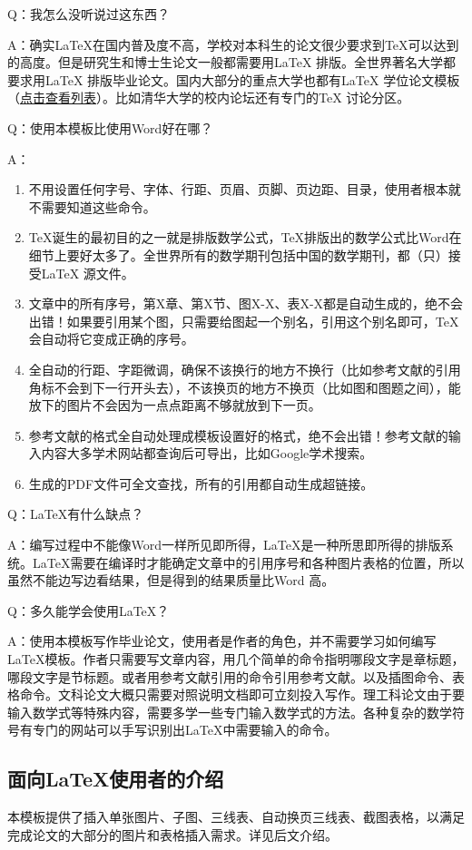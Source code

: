Q：我怎么没听说过这东西？

A：确实\LaTeX{}在国内普及度不高，学校对本科生的论文很少要求到\TeX{}可以达到的高度。但是研究生和博士生论文一般都需要用\LaTeX{} 排版。全世界著名大学都要求用\LaTeX{} 排版毕业论文。国内大部分的重点大学也都有\LaTeX{} 学位论文模板（\href{http://zzg34b.w3.c361.com/templet/graduateThesis.htm}{点击查看列表}）。比如清华大学的校内论坛还有专门的TeX 讨论分区。

Q：使用本模板比使用Word好在哪？

A：
\begin{enumerate}
\item 不用设置任何字号、字体、行距、页眉、页脚、页边距、目录，使用者根本就不需要知道这些命令。
\item \TeX{}诞生的最初目的之一就是排版数学公式，\TeX{}排版出的数学公式比Word在细节上要好太多了。全世界所有的数学期刊包括中国的数学期刊，都（只）接受\LaTeX{} 源文件。
\item 文章中的所有序号，第X章、第X节、图X-X、表X-X都是自动生成的，绝不会出错！如果要引用某个图，只需要给图起一个别名，引用这个别名即可，TeX 会自动将它变成正确的序号。
\item 全自动的行距、字距微调，确保不该换行的地方不换行（比如参考文献的引用角标不会到下一行开头去），不该换页的地方不换页（比如图和图题之间），能放下的图片不会因为一点点距离不够就放到下一页。
\item 参考文献的格式全自动处理成模板设置好的格式，绝不会出错！参考文献的输入内容大多学术网站都查询后可导出，比如Google学术搜索。
\item 生成的PDF文件可全文查找，所有的引用都自动生成超链接。
\end{enumerate}

Q：\LaTeX{}有什么缺点？

A：编写过程中不能像Word一样所见即所得，\LaTeX{}是一种所思即所得的排版系统。\LaTeX{}需要在编译时才能确定文章中的引用序号和各种图片表格的位置，所以虽然不能边写边看结果，但是得到的结果质量比Word 高。

Q：多久能学会使用\LaTeX{}？

A：使用本模板写作毕业论文，使用者是作者的角色，并不需要学习如何编写\LaTeX{}模板。作者只需要写文章内容，用几个简单的命令指明哪段文字是章标题，哪段文字是节标题。或者用参考文献引用的命令引用参考文献。以及插图命令、表格命令。文科论文大概只需要对照说明文档即可立刻投入写作。理工科论文由于要输入数学式等特殊内容，需要多学一些专门输入数学式的方法。各种复杂的数学符号有专门的网站可以手写识别出LaTeX中需要输入的命令。

\subsection{面向\LaTeX{}使用者的介绍}
本模板提供了插入单张图片、子图、三线表、自动换页三线表、截图表格，以满足完成论文的大部分的图片和表格插入需求。详见后文介绍。

